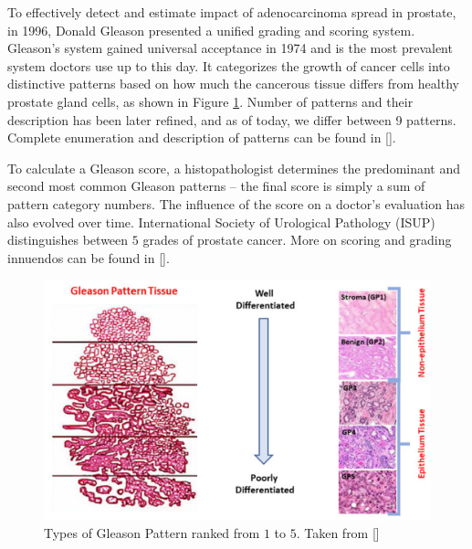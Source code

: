 To effectively detect and estimate impact of adenocarcinoma spread in prostate, in 1996, Donald Gleason presented a unified grading and scoring system. Gleason's system gained universal acceptance in 1974 and is the most prevalent system doctors use up to this day. It categorizes the growth of cancer cells into distinctive patterns based on how much the cancerous tissue differs from healthy prostate gland cells, as shown in Figure \ref{fig:gp}. Number of patterns and their description has been later refined, and as of today, we differ between 9 patterns. Complete enumeration and description of patterns can be found in [].

To calculate a Gleason score, a histopathologist determines the predominant and second most common Gleason patterns -- the final score is simply a sum of pattern category numbers. The influence of the score on a doctor's evaluation has also evolved over time. International Society of Urological Pathology (ISUP) distinguishes between $5$ grades of prostate cancer. More on scoring and grading innuendos can be found in [].

\begin{figure}[!h]
    \begin{center}
    \begin{minipage}{1\textwidth}
      \includegraphics[width=\textwidth]{img/gp-classification.png}
    \end{minipage}
    \caption{Types of Gleason Pattern ranked from $1$ to $5$. Taken from []}
    \label{fig:gp}
    \end{center}
\end{figure}

